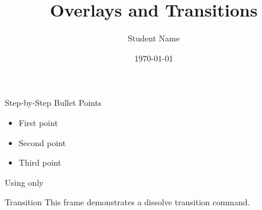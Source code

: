 \documentclass{beamer}
\title{Overlays and Transitions}
\author{Student Name}
\date{\today}
\begin{document}
\begin{frame}
  \titlepage
\end{frame}
\begin{frame}{Step-by-Step Bullet Points}
  \begin{itemize}
    \item First point
    \pause
    \item Second point
    \pause
    \item Third point
  \end{itemize}
\end{frame}
\begin{frame}{Using only}
\end{frame}
\begin{frame}{Transition}
  \transdissolve
  This frame demonstrates a dissolve transition command.
\end{frame}
\end{document}
